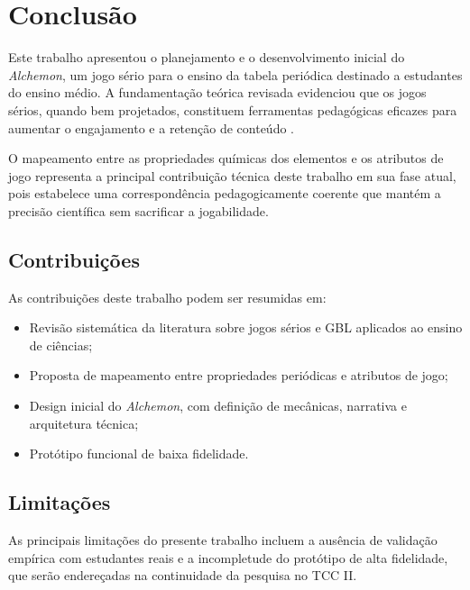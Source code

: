 
\section{Conclusão}

Este trabalho apresentou o planejamento e o desenvolvimento inicial do
\textit{Alchemon}, um jogo sério para o ensino da tabela periódica destinado
a estudantes do ensino médio. A fundamentação teórica revisada evidenciou
que os jogos sérios, quando bem projetados, constituem ferramentas pedagógicas
eficazes para aumentar o engajamento e a retenção de conteúdo
\cite{gee2003videogames, prensky2001digital}.

O mapeamento entre as propriedades químicas dos elementos e os atributos de
jogo representa a principal contribuição técnica deste trabalho em sua fase
atual, pois estabelece uma correspondência pedagogicamente coerente que mantém
a precisão científica sem sacrificar a jogabilidade.

\subsection{Contribuições}

As contribuições deste trabalho podem ser resumidas em:

\begin{itemize}
    \item Revisão sistemática da literatura sobre jogos sérios e GBL aplicados
          ao ensino de ciências;
    \item Proposta de mapeamento entre propriedades periódicas e atributos de jogo;
    \item Design inicial do \textit{Alchemon}, com definição de mecânicas,
          narrativa e arquitetura técnica;
    \item Protótipo funcional de baixa fidelidade.
\end{itemize}

\subsection{Limitações}

As principais limitações do presente trabalho incluem a ausência de validação
empírica com estudantes reais e a incompletude do protótipo de alta fidelidade,
que serão endereçadas na continuidade da pesquisa no TCC II.


